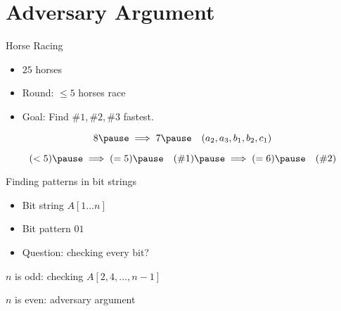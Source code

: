 \section{Adversary Argument}

\begin{frame}{Horse Racing}
  \begin{example}
	\begin{itemize}
	  \item $25$ horses
	  \item Round: $\le 5$ horses race
	  \item Goal: Find $\#1, \#2, \#3$ fastest.
	\end{itemize}
  \end{example}

  \pause
  \[ 8 \pause \implies 7 \pause \quad (a_2, a_3, b_1, b_2, c_1) \]

  \pause
  \[ (< 5) \pause \implies (= 5) \pause \quad (\#1) \pause \implies (= 6) \pause \quad (\#2)\]
\end{frame}
\begin{frame}{Finding patterns in bit strings}
  \begin{example}
	\begin{itemize}
	  \item Bit string $A[1 \ldots n]$
	  \item Bit pattern $01$
	  \item Question: checking every bit?
	\end{itemize}
  \end{example}

  \pause
  \vspace{0.60cm}
  \centerline{$n$ is odd: checking $A[2, 4,\ldots, n-1]$}

  \pause
  \vspace{0.50cm}
  \centerline{$n$ is even: adversary argument}
\end{frame}
